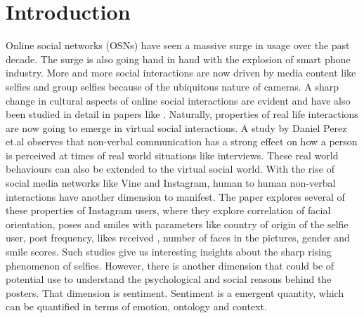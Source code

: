 \section{Introduction}
Online social networks (OSNs) have seen a massive surge in usage over the past decade. The surge is also going hand in hand with the explosion of smart phone industry. More and more social interactions are now driven by media content like selfies and group selfies because of the ubiquitous nature of cameras. A sharp change in cultural aspects of online social interactions are evident and have also been studied in detail in papers like \cite{Souza2015}. Naturally, properties of real life interactions are now going to emerge in virtual social interactions. A study by Daniel Perez et.al \cite{7175072} observes that non-verbal communication has a strong effect on how a person is perceived at times of real world situations like interviews. These real world behaviours can also be extended to the virtual social world. With the rise of social media networks like Vine and Instagram, human to human non-verbal interactions have another dimension to manifest. 
The \cite{Souza2015} paper explores several of these properties of Instagram users, where they explore correlation of facial orientation, poses and smiles with parameters like country of origin of the selfie user, post frequency, likes received , number of faces in the pictures, gender and smile scores. Such studies give us interesting insights about the sharp rising phenomenon of selfies. However, there is another dimension that could be of potential use to understand the psychological and social reasons behind the posters. That dimension is sentiment. Sentiment is a emergent quantity, which can be quantified in terms of emotion, ontology and context. 